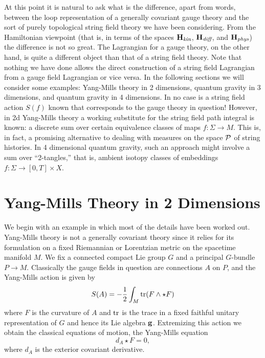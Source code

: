 \documentclass[12pt]{article}
\newcommand{\maps}{\colon}
\renewcommand{\P}{{\cal P}}
\renewcommand{\H}{{\bf H}}
\newcommand{\g}{{\bf  g}}	%
\newcommand{\hf}{{1\over 2}}
\newcommand{\tr}{{\rm tr}}
\begin{document}
At this point it is natural to ask what is the difference, apart from
words, between the loop representation of a generally covariant gauge
theory and the sort of purely topological string field theory we have been
considering.   From the Hamiltonian viewpoint (that is, in terms of the
spaces $\H_{\textit{kin}}$, $\H_{\textit{diff}}$, and $\H_{\textit{phys}}$) the difference is not so
great.  The Lagrangian for a gauge theory, on the other hand, is quite a
different object than that of a string field theory. Note that nothing we
have done allows the direct construction of a string field Lagrangian from
a gauge field Lagrangian or vice versa. In the following sections we will
consider some examples:  Yang-Mills theory in 2 dimensions, quantum gravity
in 3 dimensions, and quantum gravity in 4 dimensions.  In no case is a
string field action $S(f)$ known that corresponds to the gauge theory in
question!    However, in 2d Yang-Mills theory a working substitute for the
string field path integral is known: a discrete sum over certain
equivalence classes of maps $f \maps \Sigma \to M$.  This is, in fact, a
promising alternative to dealing with measures on the space $\P$ of string
histories.   In 4 dimensional quantum gravity, such an approach might
involve a sum over ``2-tangles,'' that is, ambient isotopy classes of
embeddings $f \maps \Sigma \to [0,T] \times X$.

\section{Yang-Mills Theory in 2 Dimensions}

We begin with an example in which most of the details have been worked out.
Yang-Mills theory is not a generally covariant theory since it relies for
its formulation on a fixed Riemannian or Lorentzian metric on the spacetime
manifold $M$.  We fix a connected compact Lie group $G$ and a principal
$G$-bundle $P \to M$.  Classically the gauge fields in question are
connections $A$ on $P$, and the Yang-Mills action is given by
\[         S(A) =   -\hf \int_M \tr(F\wedge\star F)   \]
where $F$ is the curvature of $A$ and $\tr$ is the trace in a fixed
faithful unitary representation of $G$ and hence its Lie algebra $\g$.
Extremizing this action we obtain the classical equations of motion, the
Yang-Mills equation
\[           d_A \star F = 0, \]
where $d_A$ is the exterior covariant derivative.
\end{document}
